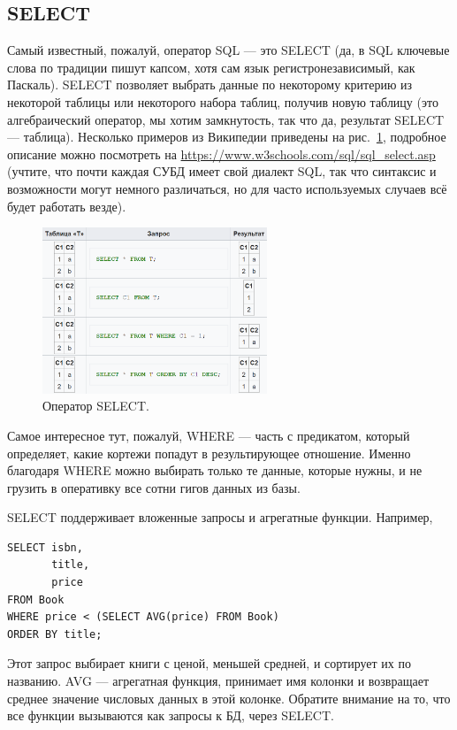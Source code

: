 \documentclass[a5paper]{article}
\begin{document}
\subsection{SELECT}

Самый известный, пожалуй, оператор SQL --- это SELECT (да, в SQL ключевые слова по традиции пишут капсом, хотя сам язык регистронезависимый, как Паскаль). SELECT позволяет выбрать данные по некоторому критерию из некоторой таблицы или некоторого набора таблиц, получив новую таблицу (это алгебраический оператор, мы хотим замкнутость, так что да, результат SELECT --- таблица). Несколько примеров из Википедии приведены на рис.~\ref{image:select}, подробное описание можно посмотреть на \url{https://www.w3schools.com/sql/sql_select.asp} (учтите, что почти каждая СУБД имеет свой диалект SQL, так что синтаксис и возможности могут немного различаться, но для часто используемых случаев всё будет работать везде).

\begin{figure}
	\begin{center}
		\includegraphics[width=0.6\textwidth]{select.png}
	\end{center}
	\caption{Оператор SELECT.}
	\label{image:select}
\end{figure}

Самое интересное тут, пожалуй, WHERE --- часть с предикатом, который определяет, какие кортежи попадут в результирующее отношение. Именно благодаря WHERE можно выбирать только те данные, которые нужны, и не грузить в оперативку все сотни гигов данных из базы.

SELECT поддерживает вложенные запросы и агрегатные функции. Например, 

\begin{verbatim}
SELECT isbn,
       title,
       price
FROM Book
WHERE price < (SELECT AVG(price) FROM Book)
ORDER BY title;
\end{verbatim}

Этот запрос выбирает книги с ценой, меньшей средней, и сортирует их по названию. AVG --- агрегатная функция, принимает имя колонки и возвращает среднее значение числовых данных в этой колонке. Обратите внимание на то, что все функции вызываются как запросы к БД, через SELECT.
\end{document}
